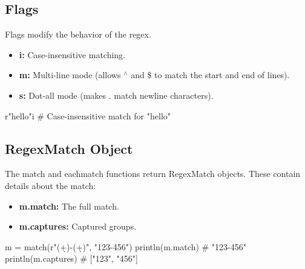 \documentclass{report}
\begin{document}
     \bigbreak \noindent 
     \subsection{Flags}
     \bigbreak \noindent 
     Flags modify the behavior of the regex. 
     \begin{itemize}
         \item \textbf{i:} Case-insensitive matching.
         \item \textbf{m:} Multi-line mode (allows $^{\land} $ and \$ to match the start and end of lines).
         \item \textbf{s:} Dot-all mode (makes . match newline characters).
     \end{itemize}
     \bigbreak \noindent 
     \begin{jlcode}
     r"hello"i  # Case-insensitive match for "hello"
     \end{jlcode}

     \bigbreak \noindent 
     \subsection{RegexMatch Object}
     \bigbreak \noindent 
     The match and eachmatch functions return RegexMatch objects. These contain details about the match:
     \begin{itemize}
         \item \textbf{m.match:} The full match.
         \item \textbf{m.captures:} Captured groups.
     \end{itemize}
     \bigbreak \noindent 
     \begin{jlcode}
         m = match(r"(\d+)-(\d+)", "123-456")
         println(m.match)    # "123-456"
         println(m.captures) # ["123", "456"]
     \end{jlcode}





















    
\end{document}
